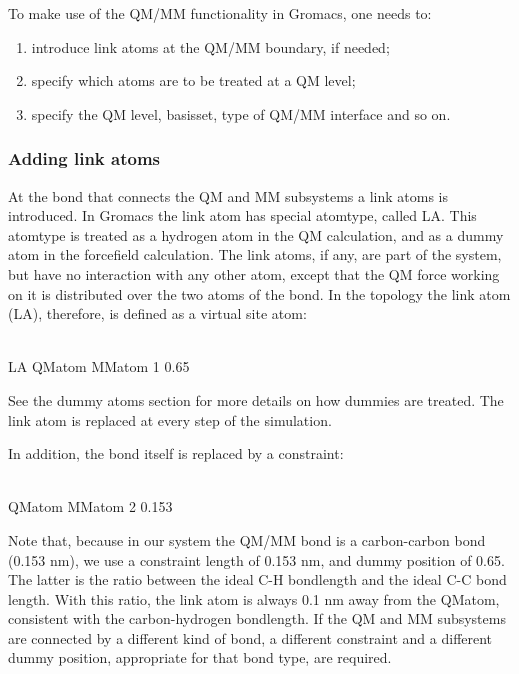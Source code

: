 To make use of the QM/MM functionality in Gromacs, one needs to:

\begin{enumerate}
\item introduce link atoms at the QM/MM boundary, if needed;
\item specify which atoms are to be treated at a QM level;
\item specify the QM level, basisset, type of QM/MM interface and so on. 
\end{enumerate}

\subsubsection{Adding link atoms}

At the bond that connects the QM and MM subsystems a link atoms is
introduced.  In Gromacs the link atom has special atomtype, called
LA. This atomtype is treated as a hydrogen atom in the QM calculation,
and as a dummy atom in the forcefield calculation. The link atoms, if
any, are part of the system, but have no interaction with any other
atom, except that the QM force working on it is distributed over the
two atoms of the bond. In the topology the link atom (LA), therefore,
is defined as a virtual site atom:\\

\begin{tt}
\\
LA QMatom MMatom 1 0.65\\
\end{tt}

See the dummy atoms section for more details on how dummies are
treated. The link atom is replaced at every step of the simulation.

In addition, the bond itself is replaced by a constraint:

\begin{tt}
[ constraints ] \\
QMatom MMatom 2 0.153\\
\end{tt}

Note that, because in our system the QM/MM bond is a carbon-carbon
bond (0.153 nm), we use a constraint length of 0.153 nm, and dummy
position of 0.65. The latter is the ratio between the ideal C-H
bondlength and the ideal C-C bond length. With this ratio, the link
atom is always 0.1 nm away from the QMatom, consistent with the
carbon-hydrogen bondlength. If the QM and MM subsystems are connected
by a different kind of bond, a different constraint and a different
dummy position, appropriate for that bond type, are required.

